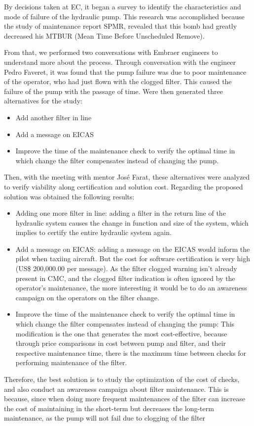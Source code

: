 By decisions taken at EC, it began a survey to identify the characteristics and mode of failure of the hydraulic pump. This research was accomplished because the study of maintenance report SPMR, revealed that this bomb had greatly decreased his MTBUR (Mean Time Before Unscheduled Remove).

From that, we performed two conversations with Embraer engineers to understand more about the process. Through conversation with the engineer Pedro Faveret, it was found that the pump failure was due to poor maintenance of the operator, who had just flown with the clogged filter. This caused the failure of the pump with the passage of time.
Were then generated three alternatives for the study:

\begin{itemize}
    \item Add another filter in line
    \item Add a message on EICAS
    \item Improve the time of the maintenance check to verify the optimal time in which change the filter compensates instead of changing the pump.
\end{itemize}

Then, with the meeting with mentor José Farat, these alternatives were analyzed to verify viability along certification and solution cost.
Regarding the proposed solution was obtained the following results:

\begin{itemize}
    \item Adding one more filter in line: adding a filter in the return line of the hydraulic system causes the change in function and size of the system, which implies to certify the entire hydraulic system again.
    \item Add a message on EICAS: adding a message on the EICAS would inform the pilot when taxiing aircraft. But the cost for software certification is very high (US\$ 200,000.00 per message). As the filter clogged warning isn't already present in CMC, and the clogged filter indication is often ignored by the operator's maintenance, the more interesting it would be to do an awareness campaign on the operators on the filter change.
    \item Improve the time of the maintenance check to verify the optimal time in which change the filter compensates instead of changing the pump: This modification is the one that generates the most cost-effective, because through price comparisons in cost between pump and filter, and their respective maintenance time, there is the maximum time between checks for performing maintenance of the filter.
\end{itemize}

Therefore, the best solution is to study the optimization of the cost of checks, and also conduct an awareness campaign about filter maintenance. This is because, since when doing more frequent maintenances of the filter can increase the cost of maintaining in the short-term but decreases the long-term maintenance, as the pump will not fail due to clogging of the filter
